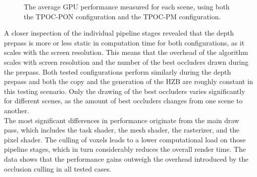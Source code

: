 \documentclass[conference]{IEEEtran}
\begin{document}
\begin{figure}
    \begin{center}
    \end{center}
    \caption{The average \ac{GPU} performance measured for each scene, using both the \ac{TPOC-PON} 
    configuration and the \ac{TPOC-PM} configuration.}
    \label{fig:gpu-performance-full}
\end{figure}

\noindent
A closer inspection of the individual pipeline stages revealed that the depth prepass is more or less static in 
computation time for both configurations, as it scales with the screen resolution. This means that the overhead 
of the algorithm scales with screen resolution and the number of the best occluders drawn during the prepass. 
Both tested configurations perform similarly during the depth prepass and both the copy and the generation of the 
\ac{HZB} are roughly constant in this testing scenario. Only the drawing of the best occluders varies significantly 
for different scenes, as the amount of best occluders changes from one scene to another. \\

\noindent
The most significant differences in performance originate from the main draw pass, which includes the task shader, 
the mesh shader, the rasterizer, and the pixel shader. The culling of voxels leads to a lower computational 
load on those pipeline stages, which in turn considerably reduces the overall render time. The data shows that the 
performance gains outweigh the overhead introduced by the occlusion culling in all tested cases.  
\end{document}
